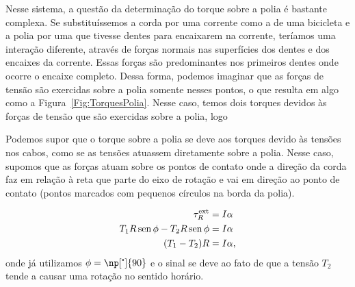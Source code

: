 Nesse sistema, a questão da determinação do torque sobre a polia é bastante complexa. Se substituíssemos a corda por uma corrente como a de uma bicicleta e a polia por uma que tivesse dentes para encaixarem na corrente, teríamos uma interação diferente, através de forças normais nas superfícies dos dentes e dos encaixes da corrente. Essas forças são predominantes nos primeiros dentes onde ocorre o encaixe completo. Dessa forma, podemos imaginar que as forças de tensão são exercidas sobre a polia somente nesses pontos, o que resulta em algo como a Figura~\eqref{Fig:TorquesPolia}. Nesse caso, temos dois torques devidos às forças de tensão que são exercidas sobre a polia, logo
%
\begin{marginfigure}
\centering
{}
\caption{Podemos supor que o torque sobre a polia se deve aos torques devido às tensões nos cabos, como se as tensões atuassem diretamente sobre a polia. Nesse caso, supomos que as forças atuam sobre os pontos de contato onde a direção da corda faz  em relação à reta que parte do eixo de rotação e vai em direção ao ponto de contato (pontos marcados com pequenos círculos na borda da polia).\label{Fig:TorquesPolia}}
\end{marginfigure}
%
\begin{align}
    \tau_R^{\rm{ext}} &= I \alpha \\
    T_1 R \operatorname{sen}\phi - T_2 R \operatorname{sen}\phi &= I \alpha \\
    (T_1 - T_2) R &= I\alpha,
\end{align}
%
onde já utilizamos $\phi = \np[\tcdegree]{90}$ e o sinal se deve ao fato de que a tensão $T_2$ tende a causar uma rotação no sentido horário.

